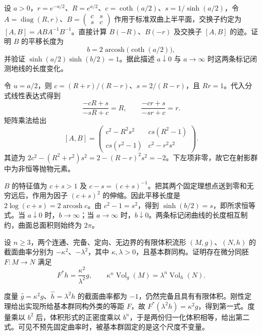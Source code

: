 \begin{exercise}\label{g3:ex:D-ideal-quadrilateral-matrices}
	设 \(a>0\)，\(r=e^{-a/2}\)、\(R=e^{a/2}\)、\(c=\coth(a/2)\)、\(s=1/\sinh(a/2)\)，令 \(A=\operatorname{diag}(R,r)\)、\(B=\left(\begin{smallmatrix}c&s\\s&c\end{smallmatrix}\right)\) 作用于标准双曲上半平面，交换子约定为 \([A,B]=ABA^{-1}B^{-1}\)。直接计算 \(B(-R)\)、\(B(-r)\) 及交换子 \([A,B]\) 的迹。证明 \(B\) 的平移长度为
	\[
		b=2\operatorname{arcosh}\bigl(\coth(a/2)\bigr),
	\]
	并验证 \(\sinh(a/2)\sinh(b/2)=1\)。据此描述 \(a\downarrow0\) 与 \(a\to\infty\) 时这两条标记闭测地线的长度变化。
\end{exercise}
\begin{solution}
	令 \(u=a/2\)，则 \(c=(R+r)/(R-r)\)、\(s=2/(R-r)\)，且 \(Rr=1\)。代入分式线性表达式得到
	\[
		\frac{-cR+s}{-sR+c}=R,\qquad
		\frac{-cr+s}{-sr+c}=r.
	\]
	矩阵乘法给出
	\[
		[A,B]=\begin{pmatrix}
			c^2-R^2s^2&cs(R^2-1)\\
			cs(r^2-1)&c^2-r^2s^2
		\end{pmatrix}.
	\]
	其迹为 \(2c^2-(R^2+r^2)s^2=2-(R-r)^2s^2=-2\)。下左项非零，故它在射影群中为非恒等抛物元素。

	\(B\) 的特征值为 \(c+s>1\) 及 \(c-s=(c+s)^{-1}\)。把其两个固定理想点送到零和无穷远后，作用为因子 \((c+s)^2\) 的伸缩。因此平移长度是 \(2\log(c+s)=2\operatorname{arcosh}c\)。由 \(c^2-1=s^2\)，得到 \(\sinh(b/2)=s\)，即所求恒等式。当 \(a\downarrow0\) 时，\(b\to\infty\)；当 \(a\to\infty\) 时，\(b\downarrow0\)。两条标记闭曲线的长度相互制约，曲面总面积则始终为 \(2\pi\)。
\end{solution}

\begin{exercise}\label{g3:ex:D-variable-curvature-normalization}
	设 \(n\ge3\)，两个连通、完备、定向、无边界的有限体积流形 \((M,g)\)、\((N,h)\) 的截面曲率分别为 \(-\kappa^2\)、\(-\lambda^2\)，其中 \(\kappa,\lambda>0\)，且基本群同构。证明存在微分同胚 \(F:M\to N\) 满足
	\[
		F^*h=\frac{\kappa^2}{\lambda^2}g,
		\qquad
		\kappa^n\operatorname{Vol}_g(M)
		=\lambda^n\operatorname{Vol}_h(N).
	\]
\end{exercise}
\begin{solution}
	度量 \(\widehat g=\kappa^2g\)、\(\widehat h=\lambda^2h\) 的截面曲率都为 \(-1\)，仍然完备且具有有限体积。刚性定理给出实现所给基本群同构外类的等距 \(F\)，故 \(F^*(\lambda^2h)=\kappa^2g\)，得到第一式。度量乘以 \(b^2\) 后，体积形式的正密度乘以 \(b^n\)，于是两份归一化体积相等，给出第二式。可见不预先固定曲率时，被基本群固定的是这个尺度不变量。
\end{solution}

